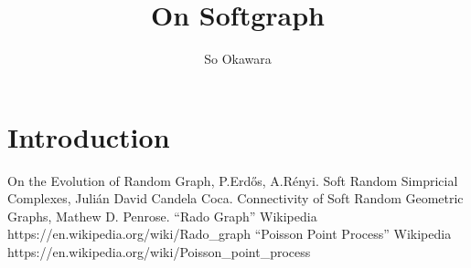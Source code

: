 \documentclass[a4paper,twocolumn]{article}
\title{On Softgraph}
\author{So Okawara}
\begin{document}
\maketitle
\section{Introduction}
\begin{thebibliography}{10}
 On the Evolution of Random Graph, P.Erdős, A.Rényi. 
 Soft Random Simpricial Complexes, Julián David Candela Coca.
 Connectivity of Soft Random Geometric Graphs, Mathew D. Penrose.
 ``Rado Graph'' Wikipedia\\ \small{https://en.wikipedia.org/wiki/Rado\_graph}
 \normalsize{``Poisson Point Process'' Wikipedia}\\ \small{https://en.wikipedia.org/wiki/Poisson\_point\_process}
\end{thebibliography}
\end{document}
